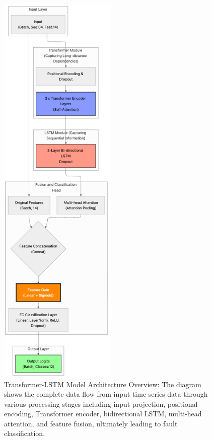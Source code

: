 \begin{figure}[p]
\centering
\includegraphics[width=0.5\textwidth]{logos/transformer-lstm.png}
\caption{Transformer-LSTM Model Architecture Overview: The diagram shows the complete data flow from input time-series data through various processing stages including input projection, positional encoding, Transformer encoder, bidirectional LSTM, multi-head attention, and feature fusion, ultimately leading to fault classification.}
\label{fig:hybrid_architecture}
\end{figure}

